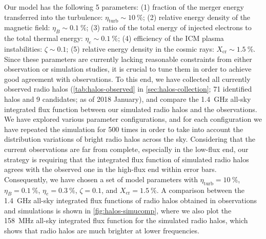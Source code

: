 \documentclass[modern]{aastex62}
\newcommand{\R}[1]{\mathrm{#1}}
\newcommand{\editone}[1]{{\leavevmode\color{cyan}#1}}
\begin{document}
Our model has the following 5 parameters:
(1) fraction of the merger energy transferred into the turbulence:
$\eta_{\R{turb}} \sim \SI{10}{\percent}$;
(2) relative energy density of the magnetic field:
$\eta_B \sim \SI{0.1}{\percent}$;
(3) ratio of the total energy of injected electrons to the total thermal
energy: $\eta_e \sim \SI{0.1}{\percent}$;
(4) efficiency of the ICM plasma instabilities:
$\zeta \sim 0.1$;
(5) relative energy density in the cosmic rays:
$X_{\R{cr}} \sim \SI{1.5}{\percent}$.
\editone{Since these parameters are currently lacking reasonable
constraints from either observation or simulation studies, it is crucial to
tune them in order to achieve good agreement with observations.} %
To this end, we have collected all currently observed radio halos
(\autoref{tab:halos-observed} in \autoref{sec:halos-collection};
71 identified halos and 9 candidates; as of 2018 January),
and compare the \SI{1.4}{\GHz} all-sky integrated flux function between
our simulated radio halos and the observations.
We have explored various parameter configurations,
and for each configuration we have repeated the simulation for 500 times
in order to take into account the distribution variations of bright
radio halos across the sky.
Considering that the current observations are far from complete,
especially in the low-flux end, our strategy is requiring that the
integrated flux function of simulated radio halos agrees with the
observed one in the high-flux end within error bars.
Consequently, we have chosen a set of model parameters with
$\eta_{\R{turb}} = \SI{10}{\percent}$, $\eta_B = \SI{0.1}{\percent}$,
$\eta_e = \SI{0.3}{\percent}$, $\zeta = 0.1$,
and $X_{\R{cr}} = \SI{1.5}{\percent}$.
A comparison between the \SI{1.4}{\GHz} all-sky integrated flux
functions of radio halos obtained in observations and simulations is
shown in \autoref{fig:halos-simucomp},
where we also plot the \SI{158}{\MHz} all-sky integrated flux function
for the simulated radio halos, which shows that radio halos are much
brighter at lower frequencies.
\end{document}
